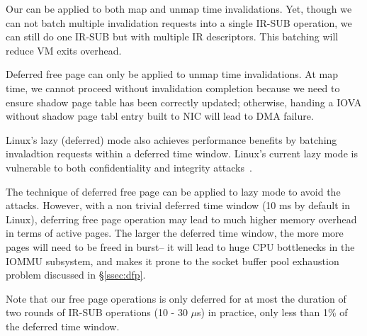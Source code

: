 Our \optOne can be applied to both map and unmap time invalidations.
Yet, though we can not batch multiple invalidation requests into a single IR-SUB operation,
we can still do one IR-SUB but with multiple IR descriptors. This batching will reduce VM exits overhead.

Deferred free page can only be applied to unmap time invalidations.
At map time, we cannot proceed without invalidation completion because we need to 
ensure shadow page table has been correctly updated;
otherwise, handing a IOVA without shadow page tabl entry built to NIC will lead to DMA failure.


Linux's lazy (deferred) mode also achieves performance benefits by batching invaladtion requests within a deferred time window.
Linux's current lazy mode is vulnerable to both confidentiality and integrity attacks~\cite{AlexCodeInjection, RajapakshaIOMMU}.

The technique of deferred free page can be applied to lazy mode to avoid the attacks.
However, with a non trivial deferred time window (10 ms by default in Linux),
    deferring free page operation may lead to much higher memory overhead in terms of active pages.
The larger the deferred time window, the more more pages will need to be freed in burst--
it will lead to huge CPU bottlenecks in the IOMMU subsystem, 
and makes it prone to the socket buffer pool exhaustion problem discussed in \S\ref{ssec:dfp}.

Note that our free page operations is only deferred for at most the duration of two rounds of IR-SUB operations (10 - 30 $\mu$s) in practice,
only less than 1\% of the deferred time window.

